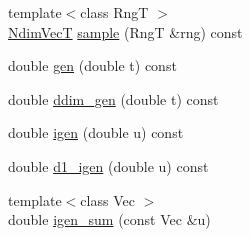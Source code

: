 \begin{DoxyCompactItemize}
\item 
{\footnotesize template$<$class RngT $>$ }\\\hyperlink{classprior__hessian_1_1AMHCopula_aee8626a3e27e52d8bfecc5201808660a}{Ndim\+VecT} \hyperlink{classprior__hessian_1_1AMHCopula_a96b5928f1be384c8d0a4efb09b8e49a1}{sample} (RngT \&rng) const 
\item 
double \hyperlink{classprior__hessian_1_1AMHCopula_a2c3506804bb44c972b94cf100404e2c6}{gen} (double t) const 
\item 
double \hyperlink{classprior__hessian_1_1AMHCopula_a9fc68a651139c1c7d28a8144562a09f3}{ddim\+\_\+gen} (double t) const 
\item 
double \hyperlink{classprior__hessian_1_1AMHCopula_a8d5daac3653a101d7068ef9dc0591002}{igen} (double u) const 
\item 
double \hyperlink{classprior__hessian_1_1AMHCopula_a19aecc89d6a1d6c46aa595a13999cfb2}{d1\+\_\+igen} (double u) const 
\item 
{\footnotesize template$<$class Vec $>$ }\\double \hyperlink{classprior__hessian_1_1AMHCopula_a38e091a72ecb8c9df42e88017b2d347e}{igen\+\_\+sum} (const Vec \&u)
\end{DoxyCompactItemize}
